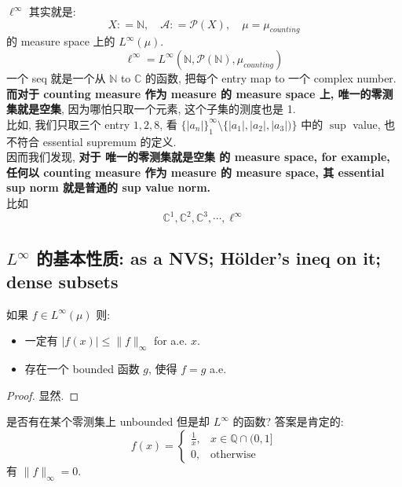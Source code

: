 \documentclass[lang=cn,11pt]{elegantbook}
\begin{document}
\begin{remark}
$\ell^\infty$ 其实就是: \[
X: = \mathbb{N},\quad \mathcal{A}: = \mathcal{P}(X),\quad \mu = \mu_{counting}
\]的 measure space 上的 $L^\infty(\mu)$. \[
\ell^\infty =L^\infty (\mathbb{N}, \mathcal{P}(\mathbb{N}), \mu_{counting} )
\]
一个 seq 就是一个从 $\mathbb{N}$ to $\mathbb{C}$ 的函数, 把每个 entry map to 一个 complex number.\\
\textbf{而对于 counting measure 作为 measure 的 measure space 上, 唯一的零测集就是空集}, 因为哪怕只取一个元素, 这个子集的测度也是 1.\\
比如, 我们只取三个 entry $1,2,8$, 看 $\{|a_n|\}_1^\infty \setminus \{|a_1|,|a_2|, |a_3|)\}$ 中的 $\sup$ value, 也不符合 essential supremum 的定义.\\
因而我们发现, \textbf{对于 唯一的零测集就是空集 的 measure space, for example, 任何以 counting measure 作为 measure 的 measure space, 其 essential sup norm 就是普通的 sup value norm.}\\
比如 \[
\mathbb{C}^1,\mathbb{C}^2,\mathbb{C}^3,\cdots,\ell^\infty
\]
\end{remark}

\subsection{$L^\infty$ 的基本性质: as a NVS; Hölder's ineq on it; dense subsets }

\begin{lemma}
如果 $f \in L^\infty(\mu) $ 则: 
\begin{itemize}
    \item 一定有 $|f(x)| \leq \|f\|_\infty$ for a.e. $x$.
    \item 存在一个 bounded 函数 $g$, 使得 $f=g$ a.e.
\end{itemize}
\end{lemma}
\begin{proof}
    显然.
\end{proof}
\begin{remark}
    是否有在某个零测集上 unbounded 但是却 $L^\infty$ 的函数? 答案是肯定的:\[
f(x) =
\begin{cases}
\frac{1}{x}, & x \in \mathbb{Q} \cap (0,1] \\
0, & \text{otherwise}
\end{cases}
\]
有 $\|f\|_\infty = 0$.
\end{remark}
\end{document}
